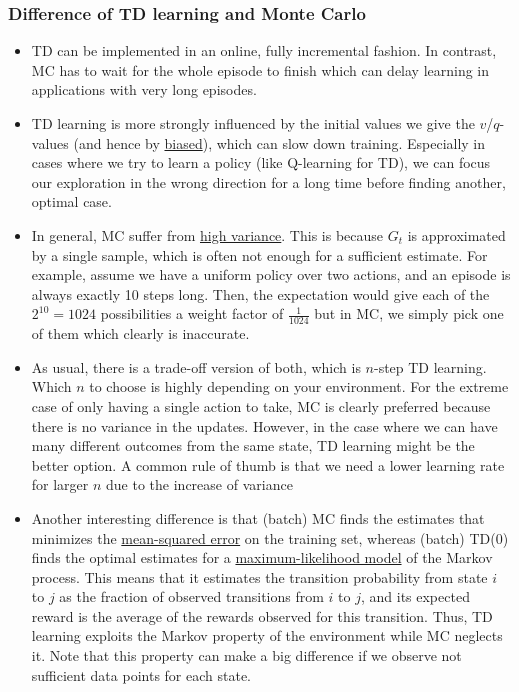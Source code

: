 \subsubsection{Difference of TD learning and Monte Carlo}
\label{sec:value_based_tabular_difference_TD_MC}
\begin{itemize}
	\item TD can be implemented in an online, fully incremental fashion. In contrast, MC has to wait for the whole episode to finish which can delay learning in applications with very long episodes.
	\item TD learning is more strongly influenced by the initial values we give the $v$/$q$-values (and hence by \underline{biased}), which can slow down training. Especially in cases where we try to learn a policy (like Q-learning for TD), we can focus our exploration in the wrong direction for a long time before finding another, optimal case.
	\item In general, MC suffer from \underline{high variance}. This is because $G_t$ is approximated by a single sample, which is often not enough for a sufficient estimate. For example, assume we have a uniform policy over two actions, and an episode is always exactly 10 steps long. Then, the expectation would give each of the $2^{10}=1024$ possibilities a weight factor of $\frac{1}{1024}$ but in MC, we simply pick one of them which clearly is inaccurate.
	\item As usual, there is a trade-off version of both, which is $n$-step TD learning. Which $n$ to choose is highly depending on your environment. For the extreme case of only having a single action to take, MC is clearly preferred because there is no variance in the updates. However, in the case where we can have many different outcomes from the same state, TD learning might be the better option. A common rule of thumb is that we need a lower learning rate for larger $n$ due to the increase of variance
	\item Another interesting difference is that (batch) MC finds the estimates that minimizes the \underline{mean-squared error} on the training set, whereas (batch) TD(0) finds the optimal estimates for a \underline{maximum-likelihood model} of the Markov process. This means that it estimates the transition probability from state $i$ to $j$ as the fraction of observed transitions from $i$ to $j$, and its expected reward is the average of the rewards observed for this transition. Thus, TD learning exploits the Markov property of the environment while MC neglects it. Note that this property can make a big difference if we observe not sufficient data points for each state.
\end{itemize}
